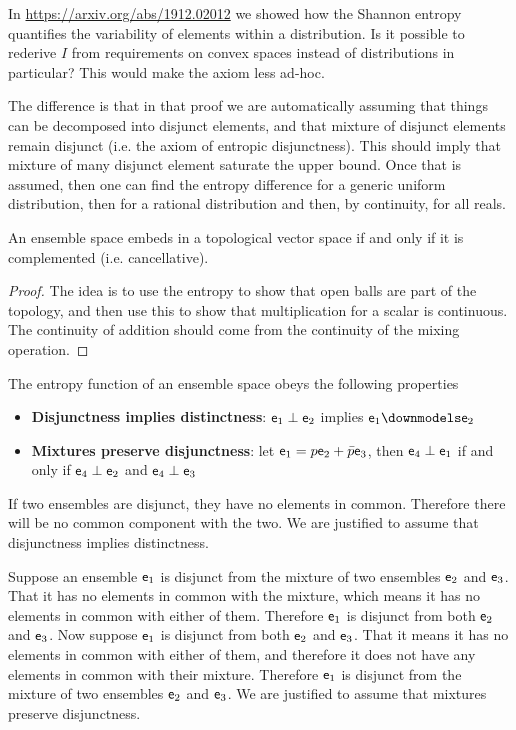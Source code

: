 \begin{remark}
	In \url{https://arxiv.org/abs/1912.02012} we showed how the Shannon entropy quantifies the variability of elements within a distribution. Is it possible to rederive $I$ from requirements on convex spaces instead of distributions in particular? This would make the axiom less ad-hoc.
	
	The difference is that in that proof we are automatically assuming that things can be decomposed into disjunct elements, and that mixture of disjunct elements remain disjunct (i.e. the axiom of entropic disjunctness). This should imply that mixture of many disjunct element saturate the upper bound. Once that is assumed, then one can find the entropy difference for a generic uniform distribution, then for a rational distribution and then, by continuity, for all reals.
\end{remark}

\begin{conj}\label{pm_es_ensemblesAreTVS}
	An ensemble space embeds in a topological vector space if and only if it is complemented (i.e. cancellative).
\end{conj}

\begin{proof}
	The idea is to use the entropy to show that open balls are part of the topology, and then use this to show that multiplication for a scalar is continuous. The continuity of addition should come from the continuity of the mixing operation.
\end{proof}

\begin{axiom}
	The entropy function of an ensemble space obeys the following properties
	\begin{itemize}
		\item \textbf{Disjunctness implies distinctness}: $\mathsf{e}_1 \perp \mathsf{e}_2$ implies $\ens_1 \distinct \ens_2$
		\item \textbf{Mixtures preserve disjunctness}: let $\mathsf{e}_1 = p \mathsf{e}_2 + \bar{p} \mathsf{e}_3$, then $\mathsf{e}_4 \perp \mathsf{e}_1$ if and only if $\mathsf{e}_4 \perp \mathsf{e}_2$ and $\mathsf{e}_4 \perp \mathsf{e}_3$
	\end{itemize}
\end{axiom}

\begin{justification}
	If two ensembles are disjunct, they have no elements in common. Therefore there will be no common component with the two. We are justified to assume that disjunctness implies distinctness.
	
	Suppose an ensemble $\mathsf{e}_1$ is disjunct from the mixture of two ensembles $\mathsf{e}_2$ and $\mathsf{e}_3$. That it has no elements in common with the mixture, which means it has no elements in common with either of them. Therefore $\mathsf{e}_1$ is disjunct from both $\mathsf{e}_2$ and $\mathsf{e}_3$. Now suppose $\mathsf{e}_1$ is disjunct from both $\mathsf{e}_2$ and $\mathsf{e}_3$. That it means it has no elements in common with either of them, and therefore it does not have any elements in common with their mixture. Therefore $\mathsf{e}_1$ is disjunct from the mixture of two ensembles $\mathsf{e}_2$ and $\mathsf{e}_3$. We are justified to assume that mixtures preserve disjunctness.
\end{justification}

